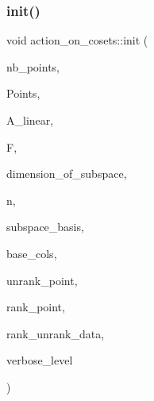 \subsubsection{\texorpdfstring{init()}{init()}}
{\footnotesize\ttfamily void action\+\_\+on\+\_\+cosets\+::init (\begin{DoxyParamCaption}\item[{\mbox{\hyperlink{galois_8h_a09fddde158a3a20bd2dcadb609de11dc}{I\+NT}}}]{nb\+\_\+points,  }\item[{\mbox{\hyperlink{galois_8h_a09fddde158a3a20bd2dcadb609de11dc}{I\+NT}} $\ast$}]{Points,  }\item[{\mbox{\hyperlink{classaction}{action}} $\ast$}]{A\+\_\+linear,  }\item[{\mbox{\hyperlink{classfinite__field}{finite\+\_\+field}} $\ast$}]{F,  }\item[{\mbox{\hyperlink{galois_8h_a09fddde158a3a20bd2dcadb609de11dc}{I\+NT}}}]{dimension\+\_\+of\+\_\+subspace,  }\item[{\mbox{\hyperlink{galois_8h_a09fddde158a3a20bd2dcadb609de11dc}{I\+NT}}}]{n,  }\item[{\mbox{\hyperlink{galois_8h_a09fddde158a3a20bd2dcadb609de11dc}{I\+NT}} $\ast$}]{subspace\+\_\+basis,  }\item[{\mbox{\hyperlink{galois_8h_a09fddde158a3a20bd2dcadb609de11dc}{I\+NT}} $\ast$}]{base\+\_\+cols,  }\item[{void($\ast$)(\mbox{\hyperlink{galois_8h_a09fddde158a3a20bd2dcadb609de11dc}{I\+NT}} $\ast$\mbox{\hyperlink{simeon_8_c_aeb3f3030944801b163bc3b829a7f6710}{v}}, \mbox{\hyperlink{galois_8h_a09fddde158a3a20bd2dcadb609de11dc}{I\+NT}} a, void $\ast$data)}]{unrank\+\_\+point,  }\item[{\mbox{\hyperlink{galois_8h_a09fddde158a3a20bd2dcadb609de11dc}{I\+NT}}($\ast$)(\mbox{\hyperlink{galois_8h_a09fddde158a3a20bd2dcadb609de11dc}{I\+NT}} $\ast$\mbox{\hyperlink{simeon_8_c_aeb3f3030944801b163bc3b829a7f6710}{v}}, void $\ast$data)}]{rank\+\_\+point,  }\item[{void $\ast$}]{rank\+\_\+unrank\+\_\+data,  }\item[{\mbox{\hyperlink{galois_8h_a09fddde158a3a20bd2dcadb609de11dc}{I\+NT}}}]{verbose\+\_\+level }\end{DoxyParamCaption})}

\mbox{\label{classaction__on__cosets_a8c475128972507cfccef674332ee9942}} 
